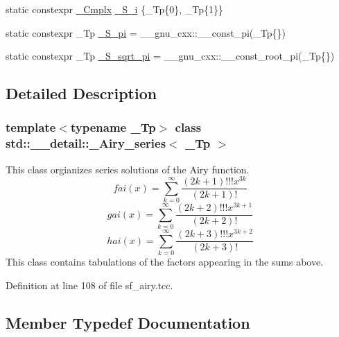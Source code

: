 \begin{DoxyCompactItemize}
\item 
static constexpr \hyperlink{classstd_1_1____detail_1_1__Airy__series_ab41161caa54609f4735987fbaed41d9d}{\+\_\+\+Cmplx} \hyperlink{classstd_1_1____detail_1_1__Airy__series_a4133b308af0c967a73c918af22c93b09}{\+\_\+\+S\+\_\+i} \{\+\_\+\+Tp\{0\}, \+\_\+\+Tp\{1\}\}
\item 
static constexpr \+\_\+\+Tp \hyperlink{classstd_1_1____detail_1_1__Airy__series_a9de354dae47d41acc60824681d864184}{\+\_\+\+S\+\_\+pi} = \+\_\+\+\_\+gnu\+\_\+cxx\+::\+\_\+\+\_\+const\+\_\+pi(\+\_\+\+Tp\{\})
\item 
static constexpr \+\_\+\+Tp \hyperlink{classstd_1_1____detail_1_1__Airy__series_a3fd1fba37ef8beb0d89854d4e58b8a38}{\+\_\+\+S\+\_\+sqrt\+\_\+pi} = \+\_\+\+\_\+gnu\+\_\+cxx\+::\+\_\+\+\_\+const\+\_\+root\+\_\+pi(\+\_\+\+Tp\{\})
\end{DoxyCompactItemize}


\subsection{Detailed Description}
\subsubsection*{template$<$typename \+\_\+\+Tp$>$\newline
class std\+::\+\_\+\+\_\+detail\+::\+\_\+\+Airy\+\_\+series$<$ \+\_\+\+Tp $>$}

This class orgianizes series solutions of the Airy function. \[ fai(x) = \sum_{k=0}^\infty \frac{(2k+1)!!!x^{3k}}{(2k+1)!} \] \[ gai(x) = \sum_{k=0}^\infty \frac{(2k+2)!!!x^{3k+1}}{(2k+2)!} \] \[ hai(x) = \sum_{k=0}^\infty \frac{(2k+3)!!!x^{3k+2}}{(2k+3)!} \] This class contains tabulations of the factors appearing in the sums above. 

Definition at line 108 of file sf\+\_\+airy.\+tcc.



\subsection{Member Typedef Documentation}
\mbox{\label{classstd_1_1____detail_1_1__Airy__series_ab41161caa54609f4735987fbaed41d9d}} 
